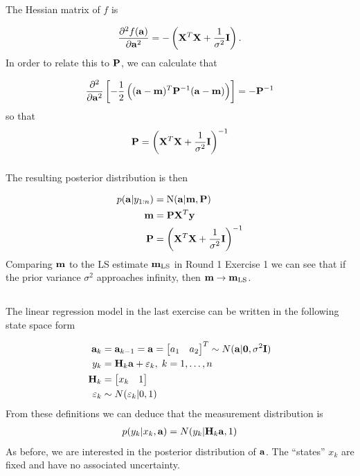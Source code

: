 \documentclass[a4paper,oneside,article]{memoir}
\begin{document}
The Hessian matrix of $f$ is

\begin{align}
	\dpd[2]{f(\v{a})}{\v{a}} = -\left(\v{X}^T\v{X}+\frac{1}{\sigma^2}\v{I}\right).
\end{align}
In order to relate this to $\mathbf{P}$, we can calculate that

\begin{align}
	\dpd[2]{}{\v{a}}\left[-\frac{1}{2}\left((\v{a}-\v{m})^T\v{P}^{-1}(\v{a}-\v{m})\right)\right] = -\v{P}^{-1} \label{eq:gauss_hessian}
\end{align}
so that 
\[
	\mathbf{P} = \left(\mathbf{X}^T\mathbf{X}+\frac{1}{\sigma^2}\mathbf{I}\right)^{-1}
\]

\subsubsection{}

The resulting posterior distribution is then

\begin{align}
	p(\mathbf{a}|y_{1:n})&=\mathrm{N}(\mathbf{a}|\mathbf{m},\mathbf{P})\\
	\mathbf{m} &= \mathbf{P}\mathbf{X}^T\mathbf{y}\\ 
	\mathbf{P} &= \left(\mathbf{X}^T\mathbf{X}+\frac{1}{\sigma^2}\mathbf{I}\right)^{-1}
\end{align}
Comparing $\mathbf{m}$ to the LS estimate $\mathbf{m}_{\mathrm{LS}}$ in Round 1 Exercise 1 we can see that
if the prior variance $\sigma^2$ approaches infinity, then $\mathbf{m}\to\mathbf{m}_{\mathrm{LS}}$. 

\subsection{}

The linear regression model in the last exercise can be written in the following state space form

\begin{align}
	\mathbf{a}_k&=\mathbf{a}_{k-1}=\mathbf{a}=\begin{bmatrix} a_1 & a_2 \end{bmatrix}^T \sim N(\mathbf{a}|\mathbf{0},\sigma^2\mathbf{I})\\
	y_k&=\mathbf{H}_k\mathbf{a}+\varepsilon_k,\; k=1,\dots,n \\
	\mathbf{H}_k&=\begin{bmatrix} x_k & 1 \end{bmatrix} \\
	\varepsilon_k &\sim N(\varepsilon_k|0,1)
\end{align}
From these definitions we can deduce that the measurement distribution is
\begin{align}
	p(y_k|x_k,\mathbf{a})=N(y_k|\mathbf{H}_k\mathbf{a},1)
\end{align}
As before, we are interested in the posterior distribution of $\mathbf{a}$. The ``states'' $x_k$ are fixed
and have no associated uncertainty. 
\end{document}
